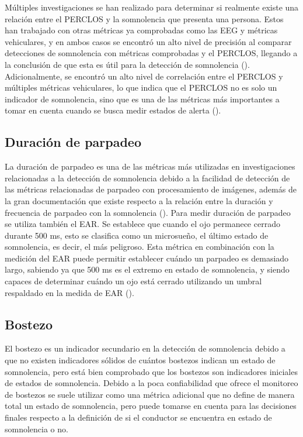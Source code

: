 Múltiples investigaciones se han realizado para determinar si realmente existe una relación entre el PERCLOS y la somnolencia que presenta una persona. Estos han trabajado con otras métricas ya comprobadas como las EEG y métricas vehiculares, y en ambos casos se encontró un alto nivel de precisión al comparar detecciones de somnolencia con métricas comprobadas y el PERCLOS, llegando a la conclusión de que esta es útil para la detección de somnolencia (\cite{MinhasPERCLOS}). Adicionalmente, se encontró un alto nivel de correlación entre el PERCLOS y múltiples métricas vehiculares, lo que indica que el PERCLOS no es solo un indicador de somnolencia, sino que es una de las métricas más importantes a tomar en cuenta cuando se busca medir estados de alerta (\cite{LibroPERCLOS}).


 
\subsection{Duración de parpadeo}
La duración de parpadeo es una de las métricas más utilizadas en investigaciones relacionadas a la detección de somnolencia debido a la facilidad de detección de las métricas relacionadas de parpadeo con procesamiento de imágenes, además de la gran documentación que existe respecto a la relación entre la duración y frecuencia de parpadeo con la somnolencia (\cite{BlinkDuration}). 
Para medir duración de parpadeo se utiliza también el EAR. Se establece que cuando el ojo permanece cerrado durante 500 ms, esto se clasifica como un microsueño, el último estado de somnolencia, es decir, el más peligroso. Esta métrica en combinación con la medición del EAR puede permitir establecer cuándo un parpadeo es demasiado largo, sabiendo ya que 500 ms es el extremo en estado de somnolencia, y siendo capaces de determinar cuándo un ojo está cerrado utilizando un umbral respaldado en la medida de EAR (\cite{BlinkDuration}). 

\subsection{Bostezo}
El bostezo es un indicador secundario en la detección de somnolencia debido a que no existen indicadores sólidos de cuántos bostezos indican un estado de somnolencia, pero está bien comprobado que los bostezos son indicadores iniciales de estados de somnolencia. Debido a la poca confiabilidad que ofrece el monitoreo de bostezos se suele utilizar como una métrica adicional que no define de manera total un estado de somnolencia, pero puede tomarse en cuenta para las decisiones finales respecto a la definición de si el conductor se encuentra en estado de somnolencia o no.

